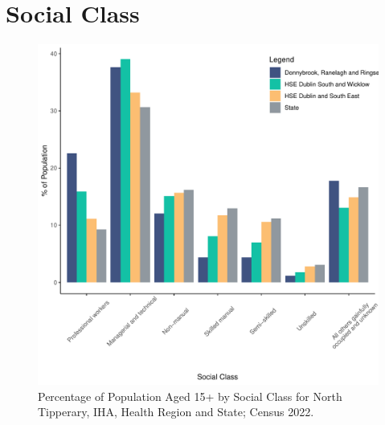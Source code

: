\documentclass{article}
\begin{document}
\section{Social Class}\label{sect:SC}
\begin{figure}[H]
	\centering
	\includegraphics[width = 140mm]{../figures/SocialClassED.pdf}
	\caption{Percentage of Population Aged 15+ by Social Class for North Tipperary, IHA, Health Region and State; Census 2022.}
	\label{fig:vbnv}
	\end{figure}
\end{document}
